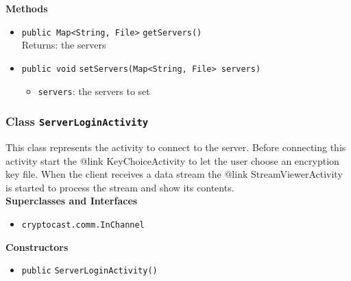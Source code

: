 \textbf{Methods}
\begin{itemize}
\item \lstinline|public Map<String, File>| \lstinline|getServers|\lstinline|()|\\
Returns: the servers



\item \lstinline|public void| \lstinline|setServers|\lstinline|(Map<String, File> servers)|

\begin{itemize}
\item \lstinline|servers|: the servers to set
\end{itemize}



\end{itemize}

\subsubsection{Class \lstinline|ServerLoginActivity|}
This class represents the activity to connect to the server.
 Before connecting this activity start the {@link KeyChoiceActivity} to 
 let the user choose an encryption key file. When the client receives a 
 data stream the {@link StreamViewerActivity} is started to process the 
 stream and show its contents. \\


\textbf{Superclasses and Interfaces}
\begin{itemize}
\item \lstinline|cryptocast.comm.InChannel|
\end{itemize}



\textbf{Constructors}
\begin{itemize}
\item \lstinline|public| \lstinline|ServerLoginActivity|\lstinline|()|




\end{itemize}


